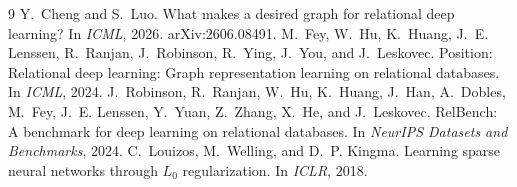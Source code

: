 \documentclass{article}
\begin{document}
\footnotesize
\begin{thebibliography}{9}
\setlength{\itemsep}{0pt}
 Y.~Cheng and S.~Luo. What makes a desired graph for relational deep learning? In \emph{ICML}, 2026. arXiv:2606.08491.
 M.~Fey, W.~Hu, K.~Huang, J.~E. Lenssen, R.~Ranjan, J.~Robinson, R.~Ying, J.~You, and J.~Leskovec. Position: Relational deep learning: Graph representation learning on relational databases. In \emph{ICML}, 2024.
 J.~Robinson, R.~Ranjan, W.~Hu, K.~Huang, J.~Han, A.~Dobles, M.~Fey, J.~E. Lenssen, Y.~Yuan, Z.~Zhang, X.~He, and J.~Leskovec. RelBench: A benchmark for deep learning on relational databases. In \emph{NeurIPS Datasets and Benchmarks}, 2024.
 C.~Louizos, M.~Welling, and D.~P. Kingma. Learning sparse neural networks through $L_0$ regularization. In \emph{ICLR}, 2018.
\end{thebibliography}
\end{document}
